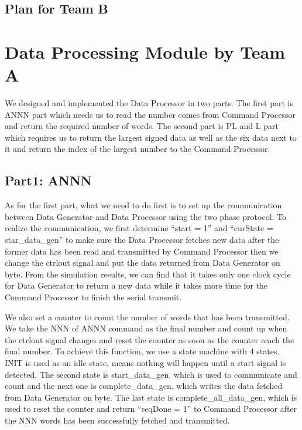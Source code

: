 \documentclass[11pt,a4paper]{report}
\begin{document}
\section{Plan for Team B}
\label{sec:Plan for Team B}





\chapter{Data Processing Module by Team A}
\label{cap:Data Processing Module by Team A}

We designed and implemented the Data Processor in two parts. The first part is ANNN part which needs us to read the number comes from Command Processor and return the required number of words. The second part is PL and L part which requires us to return the largest signed data as well as the six data next to it and return the index of the largest number to the Command Processor. 

\section{Part1: ANNN}
\label{sec:Part1: ANNN}

As for the first part, what we need to do first is to set up the communication between Data Generator 
and Data Processor using the two phase protocol. To realize the communication, we first determine “start = 1”
 and “curState = star\_{data}\_{gen}” to make sure the Data Processor fetches new data after the former data has been
  read and transmitted by Command Processor then we change the ctrlout signal and put the data returned from Data 
  Generator on byte. From the simulation results, we can find that it takes only one clock cycle for Data Generator
   to return a new data while it takes more time for the Command Processor to finish the serial transmit. 

We also set a counter to count the number of words that has been transmitted. We take the NNN of ANNN command as 
the final number and count up when the ctrlout signal changes and reset the counter as soon as the counter reach 
the final number. To achieve this function, we use a state machine with 4 states. INIT is used as an idle state, 
means nothing will happen until a start signal is detected. The second state is start\_data\_gen, which is used to 
communicate and count and the next one is complete\_data\_gen, which writes the data fetched from Data Generator 
on byte. The last state is complete\_all\_data\_gen, which is used to reset the counter and return “seqDone = 1” to
 Command Processor after the NNN words has been successfully fetched and transmitted.
\end{document}
